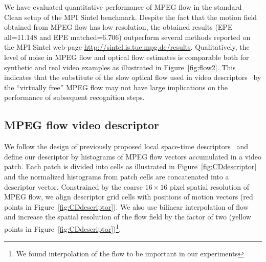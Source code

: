 
We have evaluated quantitative performance of MPEG flow in the standard Clean setup of the MPI Sintel benchmark. Despite the fact that the motion field obtained from MPEG flow has low resolution, the obtained results (EPE all=11.148 and EPE matched=6.706) outperform several methods reported on the MPI Sintel web-page {\small \url{http://sintel.is.tue.mpg.de/results}}. Qualitatively, the level of noise in MPEG flow and optical flow estimates is comparable both for synthetic and real video examples as illustrated in Figure~\ref{fig:flow2}. This indicates that the substitute of the slow optical flow used in video descriptors~\cite{Laptev08,Wang12} by the ``virtually free'' MPEG flow may not have large implications on the performance of subsequent recognition steps.





%
%




\subsection{MPEG flow video descriptor}
\label{sec:CDdescriptor}

We follow the design of previously proposed local space-time descriptors~\cite{Laptev08,Wang12} and define our descriptor by histograms of MPEG flow vectors accumulated in a video patch. Each patch is divided into cells as illustrated in Figure~\ref{fig:CDdescriptor} and the normalized histograms from patch cells are concatenated into a descriptor vector. Constrained by the coarse $16\times16$ pixel spatial resolution of MPEG flow, we align descriptor grid cells with positions of motion vectors (red points in Figure~\ref{fig:CDdescriptor}). We also use bilinear interpolation of flow and increase the spatial resolution of the flow field by the factor of two (yellow points in Figure~\ref{fig:CDdescriptor})\footnote{We found interpolation of the flow to be important in our experiments}. 

